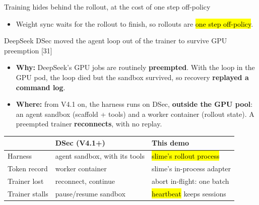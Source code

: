 \begin{frame}{Training hides behind the rollout, at the cost of one step off-policy}
\centering
{}\par
\vspace{3mm}
\raggedright
\begin{itemize}\small
\item Weight sync waits for the rollout to finish, so rollouts are \hl{one step off-policy}.
\end{itemize}
\end{frame}

\begin{frame}{DeepSeek DSec moved the agent loop out of the trainer to survive GPU preemption [31]}
\begin{itemize}\footnotesize\setlength{\itemsep}{1.5mm}
\item \textbf{Why:} DeepSeek's GPU jobs are routinely \textbf{preempted}. With the loop in the GPU pod, the loop died but the sandbox survived, so recovery \textbf{replayed a command log}.
\item \textbf{Where:} from V4.1 on, the harness runs on DSec, \textbf{outside the GPU pool}: an agent sandbox (scaffold + tools) and a worker container (rollout state). A preempted trainer \textbf{reconnects}, with no replay.
\end{itemize}
\vspace{2mm}
\footnotesize
\begin{tabularx}{\textwidth}{@{}p{}XX@{}}
\toprule
 & \textbf{DSec (V4.1+)} & \textbf{This demo}\\
\midrule
Harness & agent sandbox, with its tools & \hl{slime's rollout process}\\
Token record & worker container & slime's in-process adapter\\
Trainer lost & reconnect, continue & abort in-flight: one batch\\
Trainer stalls & pause/resume sandbox & \hl{heartbeat} keeps sessions\\
\bottomrule
\end{tabularx}
\end{frame}

